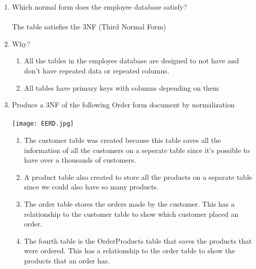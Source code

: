 \documentclass[]{article}
\begin{document}
\begin{enumerate}

\item Which normal form does the employee database satisfy?
\\\\
The table satisfies the 3NF (Third Normal Form)
\\
\item Why?

\begin{enumerate}
\item All the tables in the employee database are designed to not have and don't have repeated data or repeated columns.
\\
\item All tables have primary keys with columns depending on them
\end{enumerate}

\item Produce a 3NF of the following Order form document by normalization
\\\\
\texttt{[image: EERD.jpg]}
\\
\begin{enumerate}
\item The customer table was created because this table saves all the information of all the customers on a seperate table since it's possible to have over a thousands of customers.
\\
\item A product table also created to store all the products on a separate table since we could also have so many products.
\\
\item The order table stores the orders made by the customer. This has a relationship to the customer table to show which customer placed an order.
\\
\item The fourth table is the OrderProducts table that saves the products that were ordered. This has a relationship to the order table to show the products that an order has.

\end{enumerate}

\end{enumerate}
\end{document}
